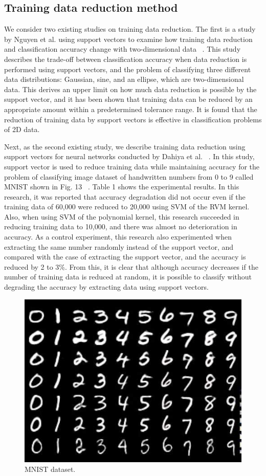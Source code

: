 \subsection{Training data reduction method}
We consider two existing studies on training data reduction. The first is a study by Nguyen et al. using support vectors to examine how training data reduction and classification accuracy change with two-dimensional data ~\cite{bib:Support-Vector-Machines-Data-Reduction-and-Approximate-Kernel-Matrices}. This study describes the trade-off between classification accuracy when data reduction is performed using support vectors, and the problem of classifying three different data distributions: Gaussian, sine, and an ellipse, which are two-dimensional data. This derives an upper limit on how much data reduction is possible by the support vector, and it has been shown that training data can be reduced by an appropriate amount within a predetermined tolerance range. It is found that the reduction of training data by support vectors is effective in classification problems of 2D data.

 Next, as the second existing study, we describe training data reduction using support vectors for neural networks conducted by Dahiya et al. ~\cite{bib:Reducing-Neural-Network-Training-Data-using-Support-Vectors}. In this study, support vector is used to reduce training data while maintaining accuracy for the problem of classifying image dataset of handwritten numbers from 0 to 9 called MNIST shown in Fig. 13 ~\cite{bib:A-novel-hybrid-CNN-SVM-classifier-for-recognizing-handwritten-digits}. Table 1 shows the experimental results. In this research, it was reported that accuracy degradation did not occur even if the training data of 60,000 were reduced to 20,000 using SVM of the RVM kernel. Also, when using SVM of the polynomial kernel, this research succeeded in reducing training data to 10,000, and there was almost no deterioration in accuracy. As a control experiment, this research also experimented when extracting the same number randomly instead of the support vector, and compared with the case of extracting the support vector, and the accuracy is reduced by 2 to 3\%. From this, it is clear that although accuracy decreases if the number of training data is reduced at random, it is possible to classify without degrading the accuracy by extracting data using support vectors.
\begin{figure}[t]
\begin{center}
\includegraphics[width=0.4\linewidth]{fig/mnist.jpeg}
\end{center}
\caption{MNIST dataset.}
\vspace*{-3pt}
\end{figure}

